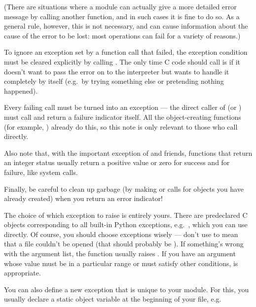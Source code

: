 \documentclass{manual}
\begin{document}
(There are situations where a module can actually give a more detailed
error message by calling another  function, and in
such cases it is fine to do so.  As a general rule, however, this is
not necessary, and can cause information about the cause of the error
to be lost: most operations can fail for a variety of reasons.)

To ignore an exception set by a function call that failed, the exception
condition must be cleared explicitly by calling . 
The only time C code should call  is if it doesn't
want to pass the error on to the interpreter but wants to handle it
completely by itself (e.g.\ by trying something else or pretending
nothing happened).

Every failing  call must be turned into an
exception --- the direct caller of  (or
) must call  and
return a failure indicator itself.  All the object-creating functions
(for example, ) already do this, so this
note is only relevant to those who call  directly.

Also note that, with the important exception of
 and friends, functions that return an
integer status usually return a positive value or zero for success and
 for failure, like \UNIX{} system calls.

Finally, be careful to clean up garbage (by making
 or  calls for objects
you have already created) when you return an error indicator!

The choice of which exception to raise is entirely yours.  There are
predeclared C objects corresponding to all built-in Python exceptions,
e.g.\ , which you can use directly.  Of
course, you should choose exceptions wisely --- don't use
 to mean that a file couldn't be opened (that
should probably be ).  If something's wrong with
the argument list, the  function usually
raises .  If you have an argument whose value
must be in a particular range or must satisfy other conditions,
 is appropriate.

You can also define a new exception that is unique to your module.
For this, you usually declare a static object variable at the
beginning of your file, e.g.
\end{document}

